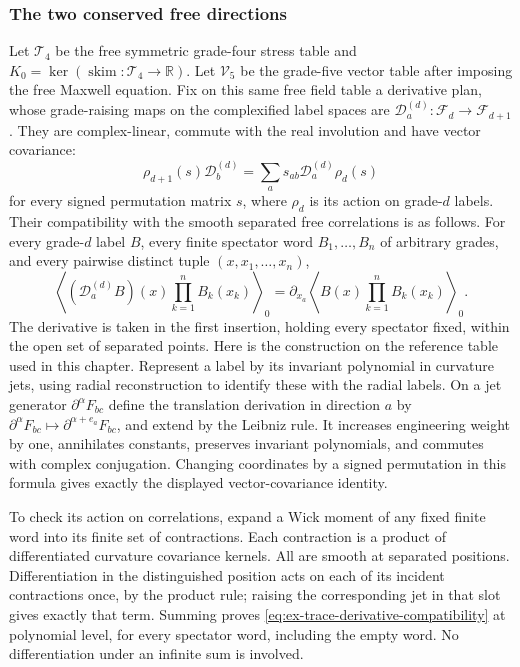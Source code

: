 \subsubsection{The two conserved free directions}

Let $\mathcal T_4$ be the free symmetric grade-four stress table and
$K_0=\ker(\operatorname{skim}:\mathcal T_4\to\mathbb R)$. Let
$\mathcal V_5$ be the grade-five vector table after imposing the free
Maxwell equation. Fix on this same free field table a derivative plan,
whose grade-raising maps on the complexified label spaces are
$\mathscr D_a^{(d)}:\mathcal F_d\to\mathcal F_{d+1}$.
They are complex-linear, commute with the real involution and have vector covariance:
\[
 \rho_{d+1}(s)\mathscr D_b^{(d)}
 =\sum_a s_{ab}\mathscr D_a^{(d)}\rho_d(s)
\]
for every signed permutation matrix $s$, where $\rho_d$ is its action on
grade-$d$ labels. Their compatibility with the
smooth separated free correlations is as follows. For every grade-$d$ label $B$, every
finite spectator word $B_1,\ldots,B_n$ of arbitrary grades, and every
pairwise distinct tuple $(x,x_1,\ldots,x_n)$,
\begin{equation}\label{eq:ex-trace-derivative-compatibility}
 \left\langle (\mathscr D_a^{(d)}B)(x)
                    \prod_{k=1}^n B_k(x_k)\right\rangle_0
 =\partial_{x_a}\left\langle B(x)
                    \prod_{k=1}^n B_k(x_k)\right\rangle_0.
\end{equation}
The derivative is taken in the first insertion, holding every spectator
fixed, within the open set of separated points. Here is the construction
on the reference table used in this chapter. Represent a label by its
invariant polynomial in curvature jets, using radial reconstruction to
identify these with the radial labels. On a jet generator
$\partial^\alpha F_{bc}$ define the translation derivation in direction
$a$ by $\partial^\alpha F_{bc}\mapsto\partial^{\alpha+e_a}F_{bc}$,
and extend by the Leibniz rule. It increases engineering weight by one,
annihilates constants, preserves invariant polynomials, and commutes with
complex conjugation. Changing coordinates by a signed permutation in
this formula gives exactly the displayed vector-covariance identity.

To check its action on correlations, expand a Wick moment of any fixed
finite word into its finite set of contractions. Each contraction is a
product of differentiated curvature covariance kernels. All are smooth
at separated positions. Differentiation in the distinguished position
acts on each of its incident contractions once, by the product rule;
raising the corresponding jet in that slot gives exactly that term.
Summing proves \eqref{eq:ex-trace-derivative-compatibility} at polynomial
level, for every spectator word, including the empty word. No
differentiation under an infinite sum is involved.

